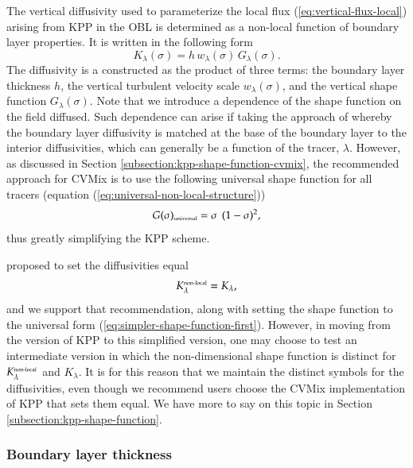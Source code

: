 The vertical diffusivity used to parameterize the local flux
(\ref{eq:vertical-flux-local}) arising from KPP in the OBL is
determined as a non-local function of boundary layer properties. It is
written in the following form
\begin{equation}
  K_{\lambda}(\sigma) = h \, w_{\lambda}(\sigma) \, G_{\lambda}(\sigma).
\label{eq:kpp-diffusivity}
\end{equation}
The diffusivity is a constructed as the product of three terms: the
boundary layer thickness $h$, the vertical turbulent velocity scale
$w_{\lambda}(\sigma)$, and the vertical shape function
$G_{\lambda}(\sigma)$.  Note that we introduce a dependence of the
shape function on the field diffused.  Such dependence can arise if
taking the approach of \cite{LargeKPP} whereby the boundary layer
diffusivity is matched at the base of the boundary layer to the
interior diffusivities, which can generally be a function of the
tracer, $\lambda$.  However, as discussed in Section
\ref{subsection:kpp-shape-function-cvmix}, the recommended approach
for CVMix is to use the following universal shape function for all
tracers (equation (\ref{eq:universal-non-local-structure}))
\begin{equation}
 G(\sigma)_{\mbox{\tiny universal}} = \sigma \, \ (1-\sigma)^{2},
\label{eq:simpler-shape-function-first}
\end{equation}
 thus greatly simplifying the KPP scheme. 

\cite{LargeKPP} proposed to set the diffusivities equal
\begin{equation}
 K^{\mbox{\tiny non-local}}_{\lambda} = K_{\lambda},
\end{equation}
and we support that recommendation, along with setting the shape
function to the universal form
(\ref{eq:simpler-shape-function-first}).  However, in moving from the
\cite{LargeKPP} version of KPP to this simplified version, one may
choose to test an intermediate version in which the non-dimensional
shape function is distinct for $K^{\mbox{\tiny non-local}}_{\lambda}$
and $K_{\lambda}$.  It is for this reason that we maintain the
distinct symbols for the diffusivities, even though we recommend users
choose the CVMix implementation of KPP that sets them equal.  We have
more to say on this topic in Section
\ref{subsection:kpp-shape-function}.


\subsubsection{Boundary layer thickness} 

